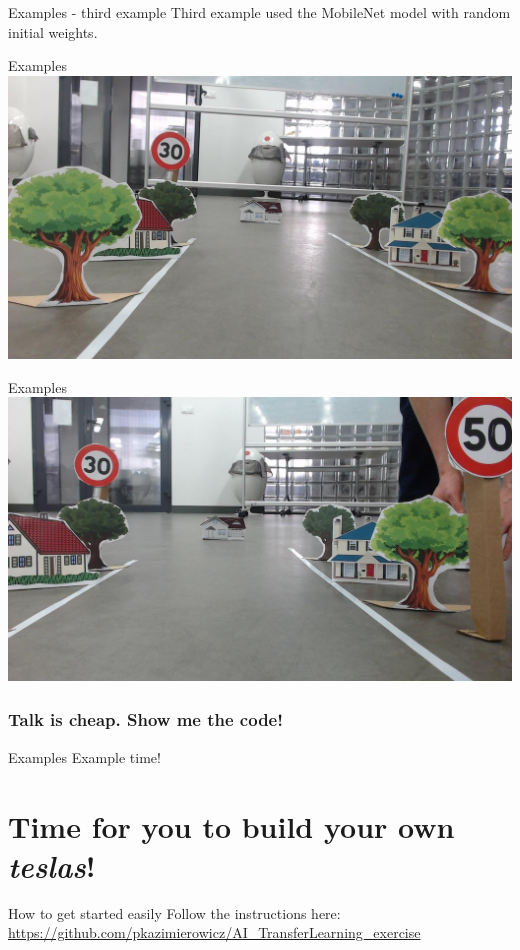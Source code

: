 \documentclass[aspectratio=1610,english]{beamer} %
\begin{document}
	
  	\begin{frame}{Examples - third example}
		Third example used the MobileNet model with random initial weights.
	\end{frame}
  	\begin{frame}{Examples}
		\includegraphics[scale=0.3]{examples/no_fine_tune_checkpoint_1000_step/session_one-6.jpg}
	\end{frame}
  	\begin{frame}{Examples}
		\includegraphics[scale=0.3]{examples/no_fine_tune_checkpoint_1000_step/session_one-10.jpg}
	\end{frame}
	
  	
  	\section{Talk is cheap. Show me the code!}
	\begin{frame}{Examples}
	Example time!
	\end{frame}
	
	
\part{Time for you to build your own \textit{teslas}!}
	\begin{frame}{How to get started easily}
	Follow the instructions here:
	\url{https://github.com/pkazimierowicz/AI_TransferLearning_exercise}
	\end{frame}
\end{document}
